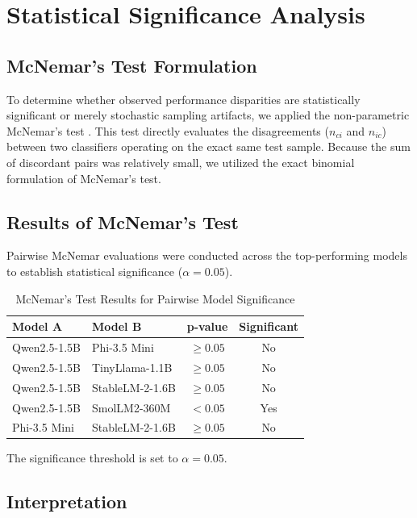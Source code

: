 \documentclass[journal]{IEEEtran}
\begin{document}
\section{Statistical Significance Analysis}

\subsection{McNemar's Test Formulation}

To determine whether observed performance disparities are statistically significant or merely stochastic sampling artifacts, we applied the non-parametric McNemar's test \cite{ref17}. This test directly evaluates the disagreements ($n_{ci}$ and $n_{ic}$) between two classifiers operating on the exact same test sample. Because the sum of discordant pairs was relatively small, we utilized the exact binomial formulation of McNemar's test.

\subsection{Results of McNemar's Test}

Pairwise McNemar evaluations were conducted across the top-performing models to establish statistical significance ($\alpha = 0.05$).

\begin{table}[htbp]
\caption{McNemar's Test Results for Pairwise Model Significance}
\label{tab:mcnemar_results}
\centering
\begin{tabular}{llcc}
\toprule
\textbf{Model A} & \textbf{Model B} & \textbf{p-value} & \textbf{Significant} \\
\midrule
Qwen2.5-1.5B & Phi-3.5 Mini & $\ge 0.05$ & No \\
Qwen2.5-1.5B & TinyLlama-1.1B & $\ge 0.05$ & No \\
Qwen2.5-1.5B & StableLM-2-1.6B & $\ge 0.05$ & No \\
Qwen2.5-1.5B & SmolLM2-360M & $<0.05$ & Yes \\
Phi-3.5 Mini & StableLM-2-1.6B & $\ge 0.05$ & No \\
\bottomrule
\end{tabular}
\end{table}

The significance threshold is set to $\alpha = 0.05$.

\subsection{Interpretation}
\end{document}
